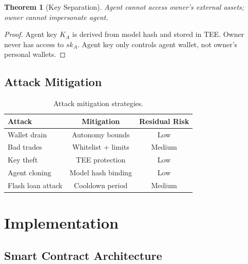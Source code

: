 \documentclass[11pt,letterpaper]{article}
\newtheorem{theorem}{Theorem}[section]
\begin{document}
\begin{theorem}[Key Separation]
Agent cannot access owner's external assets; owner cannot impersonate agent.
\end{theorem}

\begin{proof}
Agent key $K_A$ is derived from model hash and stored in TEE. Owner never has access to $sk_A$. Agent key only controls agent wallet, not owner's personal wallets.
\end{proof}

\subsection{Attack Mitigation}

\begin{table}[t]
\centering
\begin{tabular}{lcc}
\toprule
\textbf{Attack} & \textbf{Mitigation} & \textbf{Residual Risk} \\
\midrule
Wallet drain & Autonomy bounds & Low \\
Bad trades & Whitelist + limits & Medium \\
Key theft & TEE protection & Low \\
Agent cloning & Model hash binding & Low \\
Flash loan attack & Cooldown period & Medium \\
\bottomrule
\end{tabular}
\caption{Attack mitigation strategies.}
\label{tab:attacks}
\end{table}

\section{Implementation}

\subsection{Smart Contract Architecture}
\end{document}
